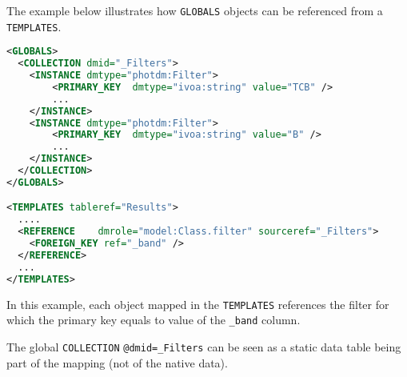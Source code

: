 The example below illustrates how \texttt{GLOBALS} objects can be referenced from a  \texttt{TEMPLATES}. 

\begin{lstlisting}[caption={Dynamic reference example},language=XML]
<GLOBALS>
  <COLLECTION dmid="_Filters">
    <INSTANCE dmtype="photdm:Filter">
		<PRIMARY_KEY  dmtype="ivoa:string" value="TCB" />
		...
	</INSTANCE>
	<INSTANCE dmtype="photdm:Filter">
		<PRIMARY_KEY  dmtype="ivoa:string" value="B" />
		...
	</INSTANCE>
  </COLLECTION>
</GLOBALS>

<TEMPLATES tableref="Results">
  ....
  <REFERENCE	dmrole="model:Class.filter"	sourceref="_Filters">
    <FOREIGN_KEY ref="_band" />
  </REFERENCE>
  ...
</TEMPLATES>

\end{lstlisting}  

In this example, each object mapped in the \texttt{TEMPLATES} references the filter for which the primary key equals to value of the \texttt{\_band} column.

The global \texttt{COLLECTION} \texttt{@dmid=\_Filters} can be seen as a static data table being part of the mapping (not of the native data).

